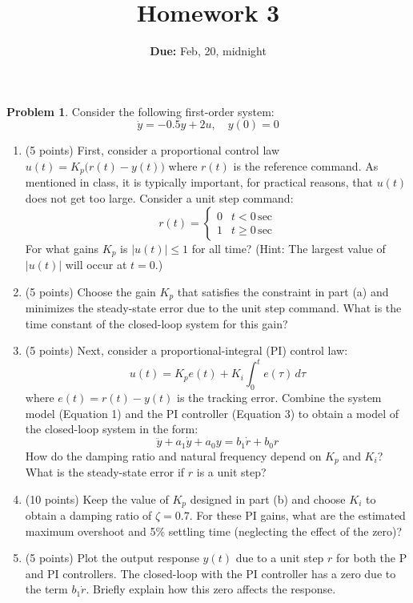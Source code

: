 \documentclass[12pt]{article}
\theoremstyle{definition}
\newtheorem{problem}{Problem}
\begin{document}
\title{Homework 3}
\author{{\bf Due:} Feb, 20, midnight}
\date{}
\maketitle

\begin{problem}
Consider the following first-order system:
\begin{equation}
    \dot{y} = -0.5y + 2u, \quad y(0) = 0 \tag{1}
\end{equation}

\begin{enumerate}[label=(\alph*)]
    \item (5 points) First, consider a proportional control law \( u(t) = K_p \big(r(t) - y(t)\big) \) where \( r(t) \) is the reference command. As mentioned in class, it is typically important, for practical reasons, that \( u(t) \) does not get too large. Consider a unit step command:
    \[
    r(t) = 
    \begin{cases} 
    0 & t < 0 \, \text{sec} \\ 
    1 & t \geq 0 \, \text{sec}
    \end{cases} \tag{2}
    \]
    For what gains \( K_p \) is \( |u(t)| \leq 1 \) for all time? (Hint: The largest value of \( |u(t)| \) will occur at \( t = 0 \).)

    \item (5 points) Choose the gain \( K_p \) that satisfies the constraint in part (a) and minimizes the steady-state error due to the unit step command. What is the time constant of the closed-loop system for this gain?

    \item (5 points) Next, consider a proportional-integral (PI) control law:
    \[
    u(t) = K_p e(t) + K_i \int_0^t e(\tau) \, d\tau \tag{3}
    \]
    where \( e(t) = r(t) - y(t) \) is the tracking error. Combine the system model (Equation 1) and the PI controller (Equation 3) to obtain a model of the closed-loop system in the form:
    \[
    \ddot{y} + a_1 \dot{y} + a_0 y = b_1 \dot{r} + b_0 r \tag{4}
    \]
    How do the damping ratio and natural frequency depend on \( K_p \) and \( K_i \)? What is the steady-state error if \( r \) is a unit step?

    \item (10 points) Keep the value of \( K_p \) designed in part (b) and choose \( K_i \) to obtain a damping ratio of \( \zeta = 0.7 \). For these PI gains, what are the estimated maximum overshoot and 5\% settling time (neglecting the effect of the zero)?

    \item (5 points) Plot the output response \( y(t) \) due to a unit step \( r \) for both the P and PI controllers. The closed-loop with the PI controller has a zero due to the term \( b_1 \dot{r} \). Briefly explain how this zero affects the response.
\end{enumerate}

\end{problem}
\end{document}
